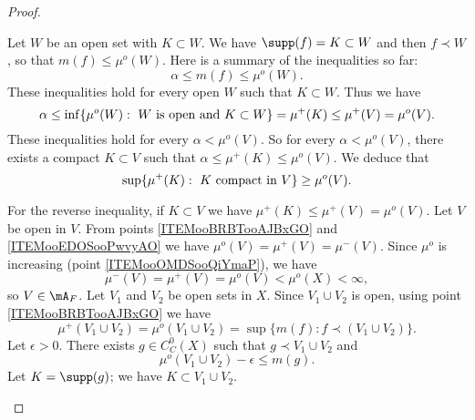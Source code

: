 \begin{proof}
\begin{subproof}
        Let \( W\) be an open set with \( K\subset W\). We have \( \supp(f)=K\subset W\) and then \( f\prec W\), so that $m(f)\leq \mu^o(W)$. Here is a summary of the inequalities so far:
        \begin{equation}
            \alpha\leq m(f)\leq \mu^o(W).
        \end{equation}
        These inequalities hold for every open \( W\) such that \( K\subset W\). Thus we have
        \begin{equation}
                \alpha\leq \inf\{ \mu^o(W):\text{ \( W\) is open and \( K\subset W\)} \} =\mu^+(K) \leq \mu^+(V)= \mu^o(V).
        \end{equation}
        These inequalities hold for every \( \alpha<\mu^o(V)\). So for every \( \alpha<\mu^o(V)\), there exists a compact \( K\subset V\) such that \( \alpha\leq \mu^+(K)\leq \mu^o(V)\). We deduce that
        \begin{equation}
            \sup\{ \mu^+(K):\text{ \( K\) compact in \( V\)} \}\geq \mu^o(V).
        \end{equation}
        
        For the reverse inequality, if \( K\subset V\) we have \( \mu^+(K)\leq \mu^+(V)=\mu^o(V)\).
        Let \( V\) be open in \( V\). From points \ref{ITEMooBRBTooAJBxGO} and \ref{ITEMooEDOSooPwvyAO} we have \( \mu^o(V)=\mu^+(V)=\mu^-(V)\). Since \( \mu^o\) is increasing (point \ref{ITEMooOMDSooQiYmaP}), we have
        \begin{equation}
            \mu^-(V)=\mu^+(V)=\mu^o(V)<\mu^o(X)<\infty,
        \end{equation}
        so \( V\in\mA_F\).
            \label{ITEMooLPYWooONCYTi}
        Let \( V_1\) and \( V_2\) be open sets in \( X\). Since \( V_1\cup V_2\) is open, using point \ref{ITEMooBRBTooAJBxGO} we have
        \begin{equation}
            \mu^+(V_1\cup V_2)=\mu^o(V_1\cup V_2)=\sup\{ m(f):f\prec (V_1\cup V_2) \}. 
        \end{equation}
        Let \( \epsilon>0\). There exists \( g\in C^0_C(X)\) such that \( g\prec V_1\cup V_2\) and 
        \begin{equation}        \label{LEMooFYAAooDaOYUy}
            \mu^o(V_1\cup V_2)-\epsilon\leq m(g).
        \end{equation}
        Let \( K=\supp(g)\); we have \( K\subset V_1\cup V_2\).


\end{subproof}
\end{proof}
